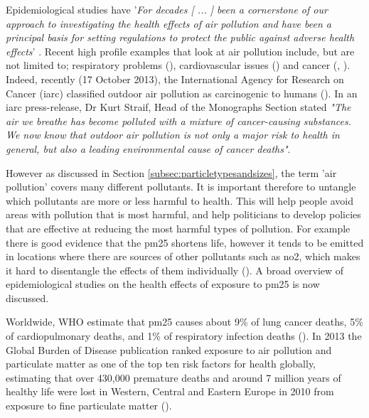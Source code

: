 Epidemiological studies have '\textit{For decades [ ... ] been a cornerstone of our approach to investigating the health effects of air pollution and have been a principal basis for setting regulations to protect the public against adverse health effects}' \cite{Zeger2000}. Recent high profile examples that look at air pollution include, but are not limited to; respiratory problems (\cite{Peacock2011}), cardiovascular issues (\cite{Brook2010}) and cancer (\cite{Iii2012}, \cite{loomis2013}). Indeed, recently (17 October 2013), the International Agency for Research on Cancer (\gls{iarc}) classified outdoor air pollution as carcinogenic to humans (\cite{loomis2013}). In an \gls{iarc} press-release, Dr Kurt Straif, Head of the Monographs Section stated \textit{"The air we breathe has become polluted with a mixture of cancer-causing substances. We now know that outdoor air pollution is not only a major risk to health in general, but also a leading environmental cause of cancer deaths"}.


However as discussed in Section \ref{subsec:particletypesandsizes}, the term 'air pollution' covers many different pollutants. It is important therefore to untangle which pollutants are more or less harmful to health. This will help people avoid areas with pollution that is most harmful, and help politicians to develop policies that are effective at reducing the most harmful types of pollution. For example there is good evidence that the \gls{pm25} shortens life, however it tends to be emitted in locations where there are sources of other pollutants such as \gls{no2}, which makes it hard to disentangle the effects of them individually (\cite{CommitteeontheMedicalEffectsofAirPollutants2018}). A broad overview of epidemiological studies on the health effects of exposure to \gls{pm25} is now discussed.

Worldwide, WHO estimate that \gls{pm25} causes about 9\% of lung cancer deaths, 5\% of cardiopulmonary deaths, and 1\% of respiratory infection deaths (\cite{WorldHealthOrganization2012}). In 2013 the Global Burden of Disease publication ranked exposure to air pollution and particulate matter as one of the top ten risk factors for health globally, estimating that over 430,000 premature deaths and around 7 million years of healthy life were lost in Western, Central and Eastern Europe in 2010 from exposure to fine particulate matter (\cite{Brauer2012}).

